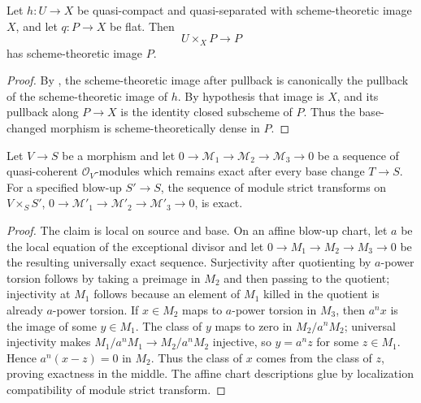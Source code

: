 \begin{lemma}
  \label{lemma:nagata-dense-flat-pullback}

  Let \(h\colon U\to X\) be quasi-compact and quasi-separated with
  scheme-theoretic image \(X\), and let
  \(q\colon P\to X\) be flat.  Then
  \[
    U\times_XP\longrightarrow P
  \]
  has scheme-theoretic image \(P\).
\end{lemma}

\begin{proof}
  By , the scheme-theoretic
  image after pullback is canonically the pullback of the scheme-theoretic
  image of $h$.  By hypothesis that image is $X$, and its pullback along
  $P\to X$ is the identity closed subscheme of $P$.  Thus the base-changed
  morphism is scheme-theoretically dense in $P$.
\end{proof}

\begin{lemma}
  \label{lemma:nagata-module-strict-transform-exact}

  Let $V\to S$ be a morphism and let
  $0\to\mathcal M_1\to\mathcal M_2\to\mathcal M_3\to0$ be a sequence of
  quasi-coherent $\mathcal O_V$-modules which remains exact after every base
  change $T\to S$.  For a specified blow-up $S'\to S$, the sequence of
  module strict transforms
  on $V\times_SS'$,
  $0\to\mathcal M'_1\to\mathcal M'_2\to\mathcal M'_3\to0$, is exact.
\end{lemma}

\begin{proof}
  The claim is local on source and base.  On an affine blow-up chart, let $a$
  be the local equation of the exceptional divisor and let
  $0\to M_1\to M_2\to M_3\to0$ be the resulting universally exact sequence.
  Surjectivity after quotienting by $a$-power torsion follows by taking a
  preimage in $M_2$ and then passing to the quotient; injectivity at $M_1$
  follows because an element of $M_1$ killed in the quotient is already
  $a$-power torsion.  If $x\in M_2$ maps to $a$-power torsion in $M_3$,
  then $a^nx$ is the image of some $y\in M_1$.  The class of $y$ maps to zero
  in $M_2/a^nM_2$; universal injectivity makes
  $M_1/a^nM_1\to M_2/a^nM_2$ injective, so $y=a^nz$ for some $z\in M_1$.
  Hence $a^n(x-z)=0$ in $M_2$.  Thus the class of $x$ comes from the class of
  $z$, proving exactness in the middle.  The affine chart descriptions glue
  by localization compatibility of module strict transform.
\end{proof}

